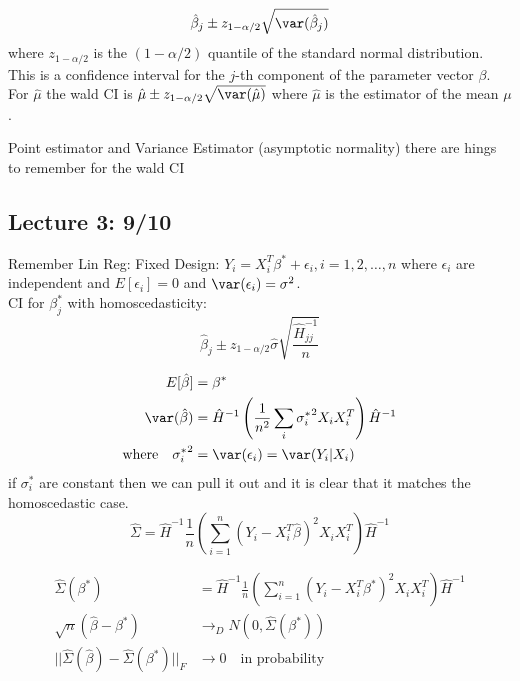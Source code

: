 \documentclass[answers,12pt,addpoints]{exam}
\begin{document}
\begin{definition}
    $$\hat{\beta}_j \pm z_{1-\alpha/2} \sqrt{\var(\hat{\beta}_j)}$$
    where $z_{1-\alpha/2}$ is the $(1-\alpha/2)$ quantile of the standard normal distribution.
    This is a confidence interval for the $j$-th component of the parameter vector $\beta$.
    For $\hat{\mu}$ the wald CI is $\hat{\mu} \pm z_{1-\alpha/2} \sqrt{\var(\hat{\mu})}$ where $\hat{\mu}$ is the estimator of the mean $\mu$.
    
    Point estimator and Variance Estimator (asymptotic normality) there are hings to remember for the wald CI 

\end{definition}

\subsection{Lecture 3: 9/10}
\begin{remark}
    Remember Lin Reg:
    Fixed Design: $Y_i = X_i^T \beta^* + \epsilon_i, i = 1,2,\ldots,n$ where $\epsilon_i$ are independent and $E[\epsilon_i] = 0$ and $\var(\epsilon_i) = \sigma^2$. \\
    CI for $\beta_j^*$ with homoscedasticity: $$\hat{\beta}_j \pm z_{1-\alpha/2} \hat\sigma \sqrt{\frac{\hat{H}^{-1}_{jj}}{n}}$$
\end{remark}

\begin{proposition}
    \begin{align*}
        E[\hat{\beta}] &= \beta^*\\
        \var(\hat{\beta}) &= \hat{H}^{-1} \left(\frac{1}{n^2} \sum_{i} {\sigma_i^{*}}^2 X_i X_i^T \right) \hat{H}^{-1}\\
        \text{where} \quad {\sigma_i^{*}}^2 &= \var(\epsilon_i) = \var(Y_i|X_i)\\
    \end{align*}
    if $\sigma_i^{*}$ are constant then we can pull it out and it is clear that it matches the homoscedastic case.
    $$ \hat{\Sigma} = \hat{H}^{-1} \frac{1}{n} \left(\sum_{i=1}^{n} (Y_i - X_i^T \hat{\beta})^2 X_i X_i^T\right) \hat{H}^{-1}$$
\end{proposition}

\begin{remark}
    \begin{align*}
        \hat{\Sigma}(\beta^*) &= \hat{H}^{-1} \frac{1}{n} \left(\sum_{i=1}^{n} (Y_i - X_i^T \beta^*)^2 X_i X_i^T\right) \hat{H}^{-1}\\
        \sqrt{n}(\hat{\beta} - \beta^*) &\to_ D N(0, \hat{\Sigma}(\beta^*))\\
        ||\hat{\Sigma}(\hat{\beta}) - \hat{\Sigma}(\beta^*)||_F &\to 0 \quad \text{in probability}
    \end{align*}
\end{remark}
\end{document}
